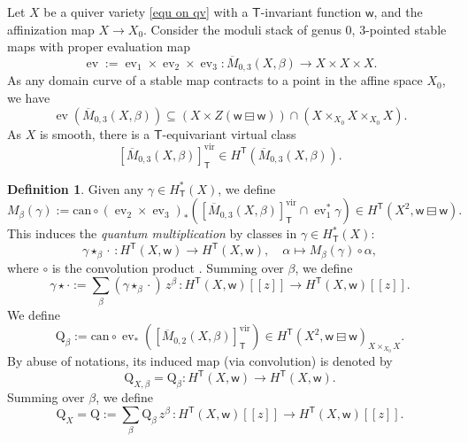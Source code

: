 \documentclass[10pt]{amsart}
\theoremstyle{definition}
\newtheorem{Definition}[Theorem]{Definition}
\numberwithin{equation}{section}
\newcommand{\sQ}{\mathrm{Q}}
\newcommand{\oO}{\mathcal{O}}
\newcommand{\vir}{\mathrm{vir}}
\newcommand{\sT}{\mathsf{T}}
\newcommand{\sw}{\mathsf{w}}
\newcommand{\ev}{\operatorname{ev}}
\newcommand{\QM}{\operatorname{QM}}
\newcommand{\yl}[1]{\textcolor{blue}{$[$ Yalong: #1 $]$}}
\begin{document}
Let $X$ be a quiver variety \eqref{equ on qv} with a $\sT$-invariant function $\sw$, and the affinization map $X\to X_0$. Consider the moduli stack  of 
genus $0$, 3-pointed stable maps with proper evaluation map 
$$\ev:=\ev_1\times \ev_2\times \ev_3\colon \overline{M}_{0,3}(X,\beta)\to X\times X\times X. $$ 
As any domain curve of a stable map contracts to a point in the affine space $X_0$, we have 
$$\ev(\overline{M}_{0,3}(X,\beta))\subseteq (X\times Z(\sw\boxminus \sw))\cap (X\times_{X_0}X\times_{X_0}X). $$
As $X$ is smooth, there is a $\sT$-equivariant virtual class 
$$[\overline{M}_{0,3}(X,\beta)]_{\sT}^{\vir}\in H^{\sT}(\overline{M}_{0,3}(X,\beta)). $$
\begin{Definition}
Given any $\gamma\in H_{\sT}^*(X)$, we define 
\begin{equation}\label{equ on Mgamma}M_{\beta}(\gamma):=\mathrm{can}\circ (\ev_{2}\times \ev_3)_*([\overline{M}_{0,3}(X,\beta)]_{\sT}^{\vir}\cap \ev_1^*\gamma)
\in H^{\sT}(X^2,\sw\boxminus \sw). \end{equation}
This induces the \textit{quantum multiplication} by classes in $\gamma \in H_{\sT}^*(X)$: 
\begin{equation}\label{equ on Mgammabeta as map}
\gamma \star_{\beta} \cdot \, \colon H^{\sT}(X,\sw)\to H^{\sT}(X,\sw), \quad \alpha\mapsto M_{\beta}(\gamma)\circ \alpha,
\end{equation}
where $\circ$ is the convolution product \cite[\S 3.4.1]{COZZ}. Summing over $\beta$, we define 
\begin{equation}\label{equ on Mgamma as map}
\gamma \star \cdot:=\sum_{\beta}(\gamma \star_{\beta} \cdot)\,z^\beta\, \colon H^{\sT}(X,\sw)[\![z]\!]\to H^{\sT}(X,\sw)[\![z]\!].
\end{equation}
We define 
$$\sQ_{\beta}:=\mathrm{can}\circ \ev_*([\overline{M}_{0,2}(X,\beta)]_{\sT}^{\vir})\in H^{\sT}(X^2,\sw\boxminus \sw)_{X\times_{X_0} X}. $$
By abuse of notations, its induced map (via convolution) is denoted by 
\begin{equation}\label{equ on Qbeta}\sQ_{X,\beta}=\sQ_{\beta}\colon H^{\sT}(X,\sw) \to H^{\sT}(X,\sw).  \end{equation}
Summing over $\beta$, we define 
\begin{equation}\label{equ on Q map}
\sQ_{X}=\sQ:=\sum_{\beta}\sQ_{\beta}\,z^\beta\, \colon H^{\sT}(X,\sw)[\![z]\!]\to H^{\sT}(X,\sw)[\![z]\!].
\end{equation}
\end{Definition}
\end{document}
